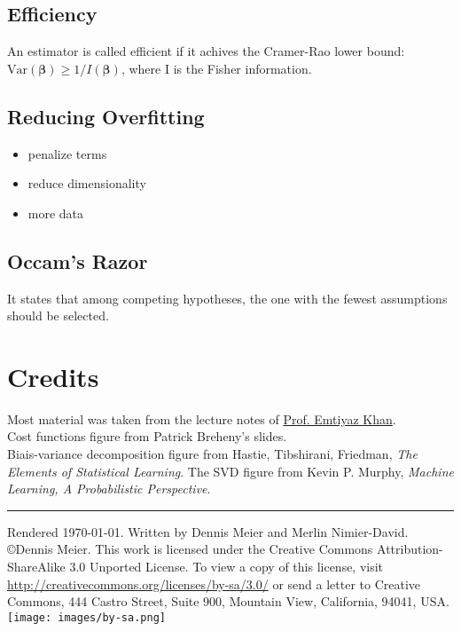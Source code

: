 \documentclass[10pt,a4paper,landscape]{article}
\newcommand{\Var}{\mathrm{Var}}
\newcommand{\bbeta}{\boldsymbol\beta}
\begin{document}
\begin{multicols*}{4}
\subsection{Efficiency}
An estimator is called efficient if it achives the Cramer-Rao lower bound:
$\Var{(\bbeta)} \geq 1/I(\bbeta)$, where I is the Fisher information.

\subsection{Reducing Overfitting}
\begin{itemize}
\item penalize terms
\item reduce dimensionality
\item more data
\end{itemize}

\subsection{Occam's Razor}
It states that among competing hypotheses, the one with the fewest assumptions should be selected. %




\section{Credits}
Most material was taken from the lecture notes of \href{http://people.epfl.ch/228491}{Prof. Emtiyaz Khan}.\\
Cost functions figure from Patrick Breheny's slides.\\
Biais-variance decomposition figure from Hastie, Tibshirani, Friedman, \textit{The Elements of Statistical Learning}.
The SVD figure from Kevin P. Murphy, \textit{Machine Learning, A Probabilistic Perspective}.

\hrule
\tiny
Rendered \today. Written by Dennis Meier and Merlin Nimier-David.
\copyright Dennis Meier. This work is licensed under the Creative Commons Attribution-ShareAlike 3.0 Unported License.
To view a copy of this license, visit \href{http://creativecommons.org/licenses/by-sa/3.0/}{http://creativecommons.org/licenses/by-sa/3.0/} or
send a letter to Creative Commons, 444 Castro Street, Suite 900, Mountain View, California, 94041, USA.
\texttt{[image: images/by-sa.png]}

\end{multicols*}
\end{document}

